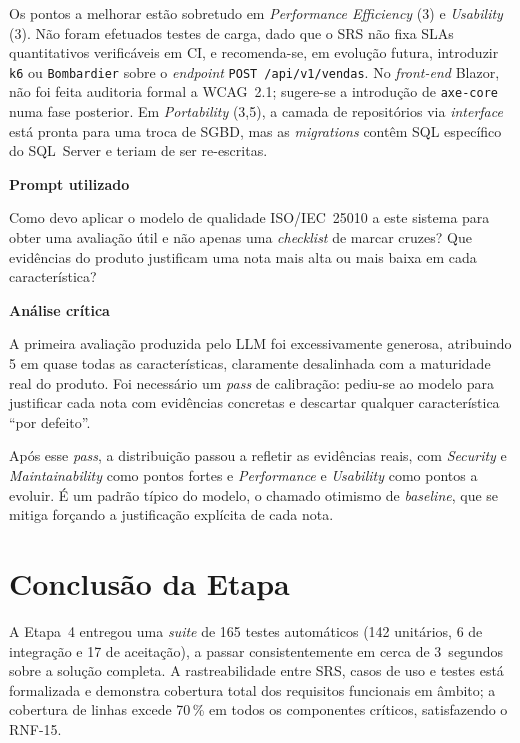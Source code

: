     Os pontos a melhorar estão sobretudo em \textit{Performance Efficiency} (3) e \textit{Usability} (3). Não foram efetuados testes de carga, dado que o SRS não fixa SLAs quantitativos verificáveis em CI, e recomenda-se, em evolução futura, introduzir \texttt{k6} ou \texttt{Bombardier} sobre o \textit{endpoint} \texttt{POST /api/v1/vendas}. No \textit{front-end} Blazor, não foi feita auditoria formal a WCAG~2.1; sugere-se a introdução de \texttt{axe-core} numa fase posterior. Em \textit{Portability} (3,5), a camada de repositórios via \textit{interface} está pronta para uma troca de SGBD, mas as \textit{migrations} contêm SQL específico do SQL~Server e teriam de ser re-escritas.

    \begin{tcolorbox}[title=Interação com o LLM]
    \textbf{Prompt utilizado}

    Como devo aplicar o modelo de qualidade ISO/IEC~25010 a este sistema para obter uma avaliação útil e não apenas uma \textit{checklist} de marcar cruzes? Que evidências do produto justificam uma nota mais alta ou mais baixa em cada característica?

    \tcblower

    \textbf{Análise crítica}

    A primeira avaliação produzida pelo LLM foi excessivamente generosa, atribuindo 5 em quase todas as características, claramente desalinhada com a maturidade real do produto. Foi necessário um \textit{pass} de calibração: pediu-se ao modelo para justificar cada nota com evidências concretas e descartar qualquer característica ``por defeito''.

    Após esse \textit{pass}, a distribuição passou a refletir as evidências reais, com \textit{Security} e \textit{Maintainability} como pontos fortes e \textit{Performance} e \textit{Usability} como pontos a evoluir. É um padrão típico do modelo, o chamado otimismo de \textit{baseline}, que se mitiga forçando a justificação explícita de cada nota.
    \end{tcolorbox}

\section{Conclusão da Etapa}

    A Etapa~4 entregou uma \textit{suite} de 165 testes automáticos (142 unitários, 6 de integração e 17 de aceitação), a passar consistentemente em cerca de 3~segundos sobre a solução completa. A rastreabilidade entre SRS, casos de uso e testes está formalizada e demonstra cobertura total dos requisitos funcionais em âmbito; a cobertura de linhas excede 70\,\% em todos os componentes críticos, satisfazendo o RNF-15.

